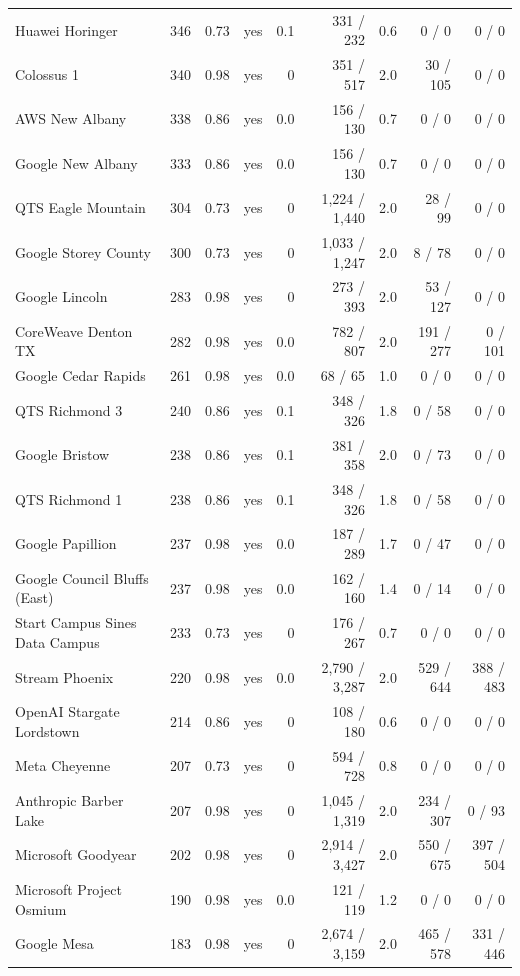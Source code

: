 {\begin{longtable}{@{}lrrlrrrrr@{}}
Huawei Horinger & 346 & 0.73 & yes & 0.1 & 331 / 232 & 0.6 & 0 / 0 & 0 / 0 \\
Colossus 1 & 340 & 0.98 & yes & 0 & 351 / 517 & 2.0 & 30 / 105 & 0 / 0 \\
AWS New Albany & 338 & 0.86 & yes & 0.0 & 156 / 130 & 0.7 & 0 / 0 & 0 / 0 \\
Google New Albany & 333 & 0.86 & yes & 0.0 & 156 / 130 & 0.7 & 0 / 0 & 0 / 0 \\
QTS Eagle Mountain & 304 & 0.73 & yes & 0 & 1,224 / 1,440 & 2.0 & 28 / 99 & 0 / 0 \\
Google Storey County & 300 & 0.73 & yes & 0 & 1,033 / 1,247 & 2.0 & 8 / 78 & 0 / 0 \\
Google Lincoln & 283 & 0.98 & yes & 0 & 273 / 393 & 2.0 & 53 / 127 & 0 / 0 \\
CoreWeave Denton TX & 282 & 0.98 & yes & 0.0 & 782 / 807 & 2.0 & 191 / 277 & 0 / 101 \\
Google Cedar Rapids & 261 & 0.98 & yes & 0.0 & 68 / 65 & 1.0 & 0 / 0 & 0 / 0 \\
QTS Richmond 3 & 240 & 0.86 & yes & 0.1 & 348 / 326 & 1.8 & 0 / 58 & 0 / 0 \\
Google Bristow & 238 & 0.86 & yes & 0.1 & 381 / 358 & 2.0 & 0 / 73 & 0 / 0 \\
QTS Richmond 1 & 238 & 0.86 & yes & 0.1 & 348 / 326 & 1.8 & 0 / 58 & 0 / 0 \\
Google Papillion & 237 & 0.98 & yes & 0.0 & 187 / 289 & 1.7 & 0 / 47 & 0 / 0 \\
Google Council Bluffs (East) & 237 & 0.98 & yes & 0.0 & 162 / 160 & 1.4 & 0 / 14 & 0 / 0 \\
Start Campus Sines Data Campus & 233 & 0.73 & yes & 0 & 176 / 267 & 0.7 & 0 / 0 & 0 / 0 \\
Stream Phoenix & 220 & 0.98 & yes & 0.0 & 2,790 / 3,287 & 2.0 & 529 / 644 & 388 / 483 \\
OpenAI Stargate Lordstown & 214 & 0.86 & yes & 0 & 108 / 180 & 0.6 & 0 / 0 & 0 / 0 \\
Meta Cheyenne & 207 & 0.73 & yes & 0 & 594 / 728 & 0.8 & 0 / 0 & 0 / 0 \\
Anthropic Barber Lake & 207 & 0.98 & yes & 0 & 1,045 / 1,319 & 2.0 & 234 / 307 & 0 / 93 \\
Microsoft Goodyear & 202 & 0.98 & yes & 0 & 2,914 / 3,427 & 2.0 & 550 / 675 & 397 / 504 \\
Microsoft Project Osmium & 190 & 0.98 & yes & 0.0 & 121 / 119 & 1.2 & 0 / 0 & 0 / 0 \\
Google Mesa & 183 & 0.98 & yes & 0 & 2,674 / 3,159 & 2.0 & 465 / 578 & 331 / 446 \\

\end{longtable}}
